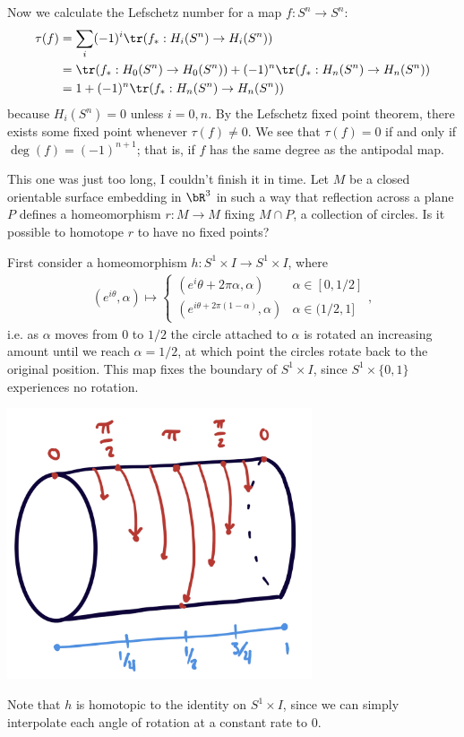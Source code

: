 \begin{homework}[e]
\begin{prf}
    Now we calculate the Lefschetz number for a map $f:S^n \to S^n$:
    \begin{align*}
      \tau(f)
      &= \sum_i (-1)^i \tr(f_*:H_i(S^n) \to H_i(S^n)) \\
      &= \tr(f_*:H_0(S^n) \to H_0(S^n)) + (-1)^n \tr(f_*:H_n(S^n)\to H_n(S^n)) \\
      &= 1 + (-1)^n\tr(f_*:H_n(S^n) \to H_n(S^n))
    \end{align*}
    because $H_i(S^n) = 0$ unless $i = 0,n$. By the Lefschetz fixed point theorem, there exists some fixed point whenever $\tau(f) \neq 0$. We see that $\tau(f) = 0$ if and only if $\deg(f) = (-1)^{n+1}$; that is, if $f$ has the same degree as the antipodal map.
  \end{prf}
   This one was just too long, I couldn't finish it in time.
   Let $M$ be a closed orientable surface embedding in $\bR^3$ in such a way that reflection across a plane $P$ defines a homeomorphism $r:M\to M$ fixing $M\cap P$, a collection of circles. Is it possible to homotope $r$ to have no fixed points?
  \begin{prf}
    First consider a homeomorphism $h:S^1\times I \to S^1\times I$, where
    \begin{align*}
      (e^{i\theta},\alpha)\mapsto
      \begin{cases}
        (e^i\theta + 2\pi \alpha,\alpha) & \alpha \in [0,1/2] \\
        (e^{i\theta + 2\pi(1 - \alpha)}, \alpha) & \alpha \in (1/2,1]
      \end{cases},
    \end{align*}
    i.e. as $\alpha$ moves from $0$ to $1/2$ the circle attached to $\alpha$ is rotated an increasing amount until we reach $\alpha = 1/2$, at which point the circles rotate back to the original position. This map fixes the boundary of $S^1\times I$, since $S^1\times \{0,1\}$ experiences no rotation.
    \begin{center}
      \includegraphics[width=9cm]{figures/hwk13-fig2.png}
      \label{fig:prob15-2}
    \end{center}
    Note that $h$ is homotopic to the identity on $S^1\times I$, since we can simply interpolate each angle of rotation at a constant rate to 0. 


\end{prf}
\end{homework}
